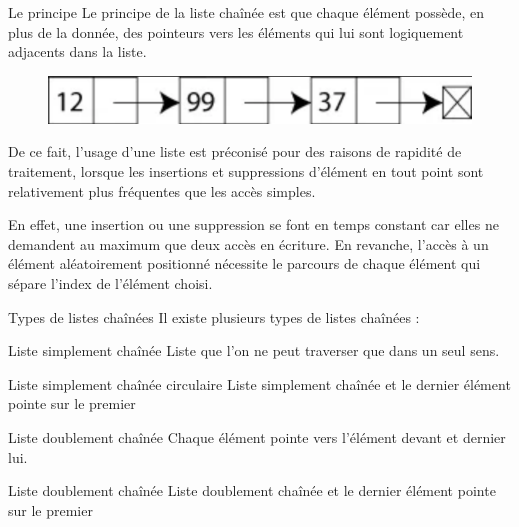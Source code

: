 \documentclass[10pt,xcolor=dvipsnames]{beamer}
\begin{document}
\begin{frame}{Le principe}
    Le principe de la liste chaînée est que chaque élément possède, en plus de la donnée, des \alert{pointeurs} vers les éléments qui lui sont logiquement adjacents dans la liste.
    
    \begin{figure}
    \centering
    \includegraphics[scale= 0.4]{figures/CM2/liste-chaine.png}
    \label{fig:my_label}
\end{figure}

De ce fait, l'usage d'une liste est préconisé pour des raisons de rapidité de traitement, lorsque les insertions et suppressions d'élément en tout point sont relativement plus fréquentes que les accès simples.

En effet, une insertion ou une suppression se font en temps constant car elles ne demandent au maximum que deux accès en écriture. En revanche, l'accès à un élément aléatoirement positionné nécessite le parcours de chaque élément qui sépare l'index de l'élément choisi.
\end{frame}

\begin{frame}{Types de listes chaînées}
    Il existe plusieurs types de listes chaînées :
    
        \begin{alertblock}{Liste simplement chaînée}
            Liste que l'on ne peut traverser que dans un seul sens.
        \end{alertblock}
        
        \begin{alertblock}{Liste simplement chaînée circulaire}
            Liste simplement chaînée et le dernier élément pointe sur le premier
        \end{alertblock}
        
        \begin{alertblock}{Liste doublement chaînée}
            Chaque élément pointe vers l'élément devant et dernier lui.
        \end{alertblock}
        
        \begin{alertblock}{Liste doublement chaînée}
            Liste doublement chaînée et le dernier élément pointe sur le premier
            
        \end{alertblock}
    
\end{frame}
\end{document}
